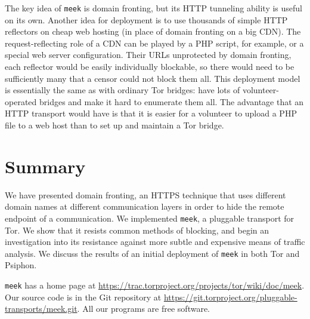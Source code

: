 \documentclass[conference]{IEEEtran}
\newcommand{\meekserver}{\mbox{meek-server}\xspace}
\newcommand{\meek}{\texttt{meek}\xspace}
\begin{document}

The key idea of \meek is domain fronting,
but its HTTP tunneling ability is useful on its own.
Another idea for deployment is to use
thousands of simple HTTP reflectors on cheap web hosting
(in place of domain fronting on a big CDN).
The request-reflecting role of a CDN can
be played by a PHP script, for example,
or a special web server configuration.
Their URLs unprotected by domain fronting,
each reflector would be easily individually blockable,
so there would need to be sufficiently many that
a censor could not block them all.
This deployment model is essentially the same as with
ordinary Tor bridges: have lots of volunteer-operated bridges
and make it hard to enumerate them all.
The advantage that an HTTP transport would have
is that it is easier for a volunteer to upload a PHP file to a web host
than to set up and maintain a Tor bridge.

\section{Summary}
\label{sec:summary}

We have presented domain fronting,
an HTTPS technique that uses different domain names
at different communication layers in
order to hide the remote endpoint of a communication.
We implemented \meek,
a pluggable transport for Tor.
We show that it resists common methods of blocking,
and begin an investigation into its
resistance against more subtle and expensive means of traffic analysis.
We discuss the results of an initial deployment of \meek
in both Tor and Psiphon.

\meek has a home page at
\url{https://trac.torproject.org/projects/tor/wiki/doc/meek}.
Our source code is in the Git repository at
\url{https://git.torproject.org/pluggable-transports/meek.git}.
All our programs are free software.

\end{document}
